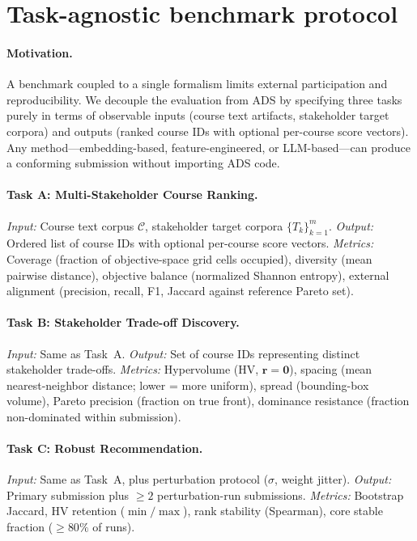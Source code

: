 \documentclass[sigconf,review]{acmart}
\newcommand{\ADS}{\textsc{ADS}\xspace}
\begin{document}
\section{Task-agnostic benchmark protocol}
\label{sec:supp-benchmark-protocol}

\paragraph{Motivation.}
A benchmark coupled to a single formalism limits external participation and reproducibility.
We decouple the evaluation from \ADS by specifying three tasks purely in terms of observable inputs (course text artifacts, stakeholder target corpora) and outputs (ranked course IDs with optional per-course score vectors).
Any method---embedding-based, feature-engineered, or LLM-based---can produce a conforming submission without importing ADS code.

\paragraph{Task A: Multi-Stakeholder Course Ranking.}
\textit{Input:} Course text corpus $\mathcal{C}$, stakeholder target corpora $\{T_k\}_{k=1}^{m}$.
\textit{Output:} Ordered list of course IDs with optional per-course score vectors.
\textit{Metrics:} Coverage (fraction of objective-space grid cells occupied), diversity (mean pairwise distance), objective balance (normalized Shannon entropy), external alignment (precision, recall, F1, Jaccard against reference Pareto set).

\paragraph{Task B: Stakeholder Trade-off Discovery.}
\textit{Input:} Same as Task~A.
\textit{Output:} Set of course IDs representing distinct stakeholder trade-offs.
\textit{Metrics:} Hypervolume (HV, $\mathbf{r} = \mathbf{0}$), spacing (mean nearest-neighbor distance; lower = more uniform), spread (bounding-box volume), Pareto precision (fraction on true front), dominance resistance (fraction non-dominated within submission).

\paragraph{Task C: Robust Recommendation.}
\textit{Input:} Same as Task~A, plus perturbation protocol ($\sigma$, weight jitter).
\textit{Output:} Primary submission plus $\geq 2$ perturbation-run submissions.
\textit{Metrics:} Bootstrap Jaccard, HV retention ($\min/\max$), rank stability (Spearman), core stable fraction ($\geq 80\%$ of runs).
\end{document}
